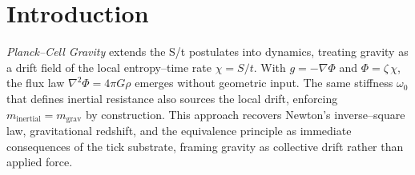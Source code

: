 \section*{Introduction}

\emph{Planck--Cell Gravity} extends the S/t postulates into dynamics, treating
gravity as a drift field of the local entropy--time rate $\chi = S/t$.
With $g = -\nabla\Phi$ and $\Phi = \zeta\,\chi$, the flux law
$\nabla^2\Phi = 4\pi G\rho$ emerges without geometric input.  The same stiffness
$\omega_0$ that defines inertial resistance also sources the local drift,
enforcing $m_{\mathrm{inertial}} = m_{\mathrm{grav}}$ by construction.  This
approach recovers Newton's inverse--square law, gravitational redshift, and the
equivalence principle as immediate consequences of the tick substrate, framing
gravity as collective drift rather than applied force.
